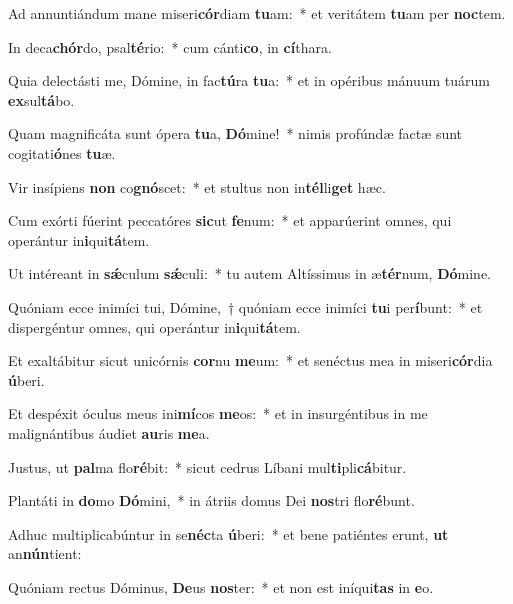 \item Ad annuntiándum mane miseri\textbf{cór}diam \textbf{tu}am:~* et veritátem \textbf{tu}am per \textbf{noc}tem.
\item In deca\textbf{chór}do, psal\textbf{té}rio:~* cum cánti\textbf{co}, in \textbf{cí}thara.
\item Quia delectásti me, Dómine, in fac\textbf{tú}ra \textbf{tu}a:~* et in opéribus mánuum tuárum \textbf{ex}sul\textbf{tá}bo.
\item Quam magnificáta sunt ópera \textbf{tu}a, \textbf{Dó}mine!~* nimis profúndæ factæ sunt cogitati\textbf{ó}nes \textbf{tu}æ.
\item Vir insípiens \textbf{non} co\textbf{gnó}scet:~* et stultus non in\textbf{tél}li\textbf{get} hæc.
\item Cum exórti fúerint peccatóres \textbf{sic}ut \textbf{fe}num:~* et apparúerint omnes, qui operántur in\textbf{i}qui\textbf{tá}tem.
\item Ut intéreant in \textbf{sǽ}culum \textbf{sǽ}culi:~* tu autem Altíssimus in æ\textbf{tér}num, \textbf{Dó}mine.
\item Quóniam ecce inimíci tui, Dómine,~† quóniam ecce inimíci \textbf{tu}i per\textbf{í}bunt:~* et dispergéntur omnes, qui operántur in\textbf{i}qui\textbf{tá}tem.
\item Et exaltábitur sicut unicórnis \textbf{cor}nu \textbf{me}um:~* et senéctus mea in miseri\textbf{cór}dia \textbf{ú}beri.
\item Et despéxit óculus meus ini\textbf{mí}cos \textbf{me}os:~* et in insurgéntibus in me malignántibus áudiet \textbf{au}ris \textbf{me}a.
\item Justus, ut \textbf{pal}ma flo\textbf{ré}bit:~* sicut cedrus Líbani mul\textbf{ti}pli\textbf{cá}bitur.
\item Plantáti in \textbf{do}mo \textbf{Dó}mini,~* in átriis domus Dei \textbf{nos}tri flo\textbf{ré}bunt.
\item Adhuc multiplicabúntur in se\textbf{néc}ta \textbf{ú}beri:~* et bene patiéntes erunt, \textbf{ut} an\textbf{nún}tient:
\item Quóniam rectus Dóminus, \textbf{De}us \textbf{nos}ter:~* et non est iníqui\textbf{tas} in \textbf{e}o.
